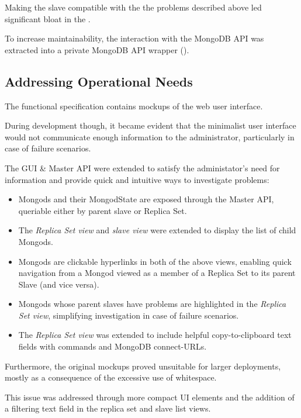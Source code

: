 Making the slave compatible with the the problems described above led significant bloat in the .

To increase maintainability, the interaction with the MongoDB API was extracted into a private MongoDB API wrapper ().

\subsection{Addressing Operational Needs}

The functional specification contains mockups of the \mamid web user interface.

During development though, it became evident that the minimalist user interface would not communicate enough information
to the administrator, particularly in case of failure scenarios.

The GUI \& Master API were extended to satisfy the administator's need for information and provide
quick and intuitive ways to investigate problems:

\begin{itemize}
  \item Mongods and their MongodState are exposed through the Master API, queriable either by parent slave or Replica Set.
  \item The \textit{Replica Set view} and \textit{slave view} were extended to display the list of child Mongods.
  \item Mongods are clickable hyperlinks in both of the above views, enabling quick navigation from a Mongod
          viewed as a member of a Replica Set to its parent Slave (and vice versa).
  \item Mongods whose parent slaves have problems are highlighted in the \textit{Replica Set view},
          simplifying investigation in case of failure scenarios.
  \item The \textit{Replica Set view} was extended to include helpful copy-to-clipboard text fields with commands and MongoDB connect-URLs.
\end{itemize}

Furthermore, the original mockups proved unsuitable for larger deployments, mostly as a consequence of the excessive use of whitespace.

This issue was addressed through more compact UI elements and the addition of a filtering text field in the replica set and slave list views.

